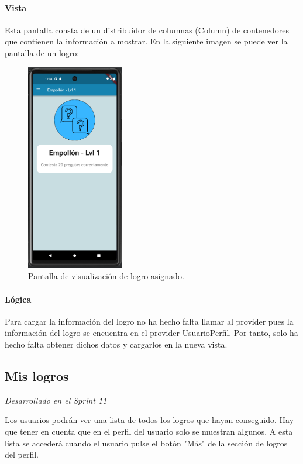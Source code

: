 \paragraph*{Vista}
Esta pantalla consta de un distribuidor de columnas (Column) de contenedores que contienen la información a mostrar. En la siguiente imagen se puede ver la pantalla de un logro: 

\begin{figure}[H]
  \centering
  \includegraphics[width=0.38\textwidth]{imagenes/c7/verlogro.png}
  \caption{Pantalla de visualización de logro asignado.} 
  \label{fig:ver_logro}
\end{figure}

\paragraph*{Lógica}
Para cargar la información del logro no ha hecho falta llamar al provider pues la información del logro se encuentra en el provider UsuarioPerfil.
Por tanto, solo ha hecho falta obtener dichos datos y cargarlos en la nueva vista.

\subsection{Mis logros} 

\textit{Desarrollado en el Sprint 11}

Los usuarios podrán ver una lista de todos los logros que hayan conseguido. Hay que tener en cuenta que en el perfil del usuario solo se muestran algunos. 
A esta lista se accederá cuando el usuario pulse el botón "Más" de la sección de logros del perfil.
